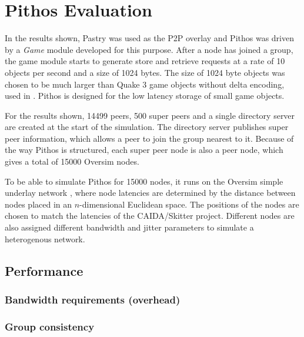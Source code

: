 \chapter{Pithos Evaluation}
    \label{chp:EVALUATION}

In the results shown, Pastry was used as the P2P overlay and Pithos was driven by a \emph{Game} module developed for this purpose. After a node has
joined a group, the game module starts to generate store and retrieve requests at a rate of 10 objects per second and a size of 1024 bytes. The size
of 1024 byte objects was chosen to be much larger than Quake 3 game objects without delta encoding, used in \cite{Bharambe_Donnybrook}. Pithos is
designed for the low latency storage of small game objects.

For the results shown, 14499 peers, 500 super peers and a single directory server are created at the start of the simulation. The directory server
publishes super peer information, which allows a peer to join the group nearest to it. Because of the way Pithos is structured, each super peer node
is also a peer node, which gives a total of 15000 Oversim nodes.

To be able to simulate Pithos for 15000 nodes, it runs on the Oversim simple underlay network \cite{oversim_applications}, where node latencies are
determined by the distance between nodes placed in an $n$-dimensional Euclidean space. The positions of the nodes are chosen to match the latencies
of the CAIDA/Skitter project. Different nodes are also assigned different bandwidth and jitter parameters to simulate a heterogenous network.

    \section{Performance}

    \subsection{Bandwidth requirements (overhead)}

        \subsection{Group consistency}

